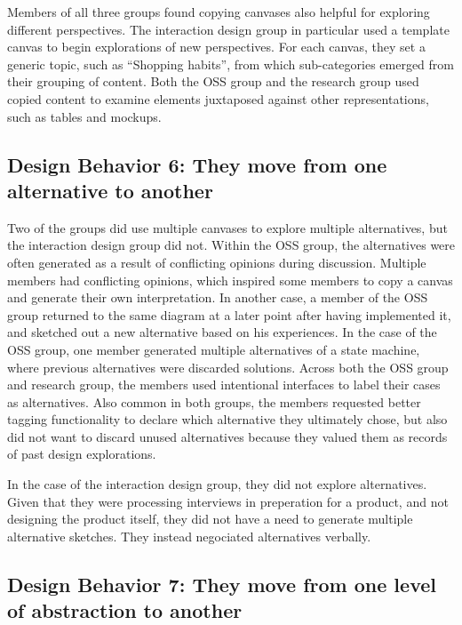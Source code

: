 Members of all three groups found copying canvases also helpful for exploring different perspectives. The interaction design group in particular used a template canvas to begin explorations of new perspectives. For each canvas, they set a generic topic, such as ``Shopping habits'', from which sub-categories emerged from their grouping of content. Both the OSS group and the research group used copied content to examine elements juxtaposed against other representations, such as tables and mockups.


\subsection{Design Behavior 6: They move from one alternative to another}

Two of the groups did use multiple canvases to explore multiple alternatives, but the interaction design group did not. Within the OSS group, the alternatives were often generated as a result of conflicting opinions during discussion. Multiple members had conflicting opinions, which inspired some members to copy a canvas and generate their own interpretation. In another case, a member of the OSS group returned to the same diagram at a later point after having implemented it, and sketched out a new alternative based on his experiences. In the case of the OSS group, one member generated multiple alternatives of a state machine, where previous alternatives were discarded solutions. Across both the OSS group and research group, the members used intentional interfaces to label their cases as alternatives. Also common in both groups, the members requested better tagging functionality to declare which alternative they ultimately chose, but also did not want to discard unused alternatives because they valued them as records of past design explorations.

In the case of the interaction design group, they did not explore alternatives. Given that they were processing interviews in preperation for a product, and not designing the product itself, they did not have a need to generate multiple alternative sketches. They instead negociated alternatives verbally.

\subsection{Design Behavior 7: They move from one level of abstraction to another}

